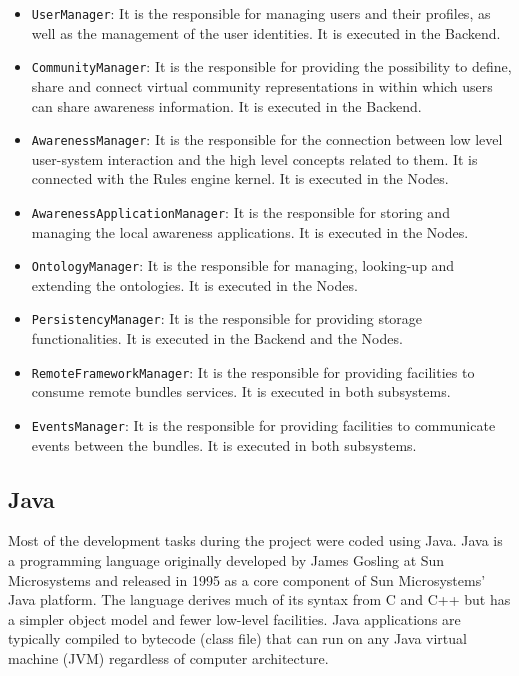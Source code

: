 \begin{itemize}
  \item \verb|UserManager|: It is the responsible for managing users and their
  profiles, as well as the management of the user identities. It is executed in
  the Backend.
  \item \verb|CommunityManager|: It is the responsible for providing the
  possibility to define, share and connect virtual community representations in within which
  users can share awareness information. It is executed in the Backend.
  \item \verb|AwarenessManager|: It is the responsible for the connection
  between low level user-system interaction and the high level concepts related to
  them. It is connected with the Rules engine kernel. It is executed in the
  Nodes.
  \item \verb|AwarenessApplicationManager|: It is the responsible for storing
  and managing the local awareness applications. It is executed
  in the Nodes.
  \item \verb|OntologyManager|: It is the responsible for managing, looking-up
  and extending the ontologies. It is executed in the Nodes.
  \item \verb|PersistencyManager|: It is the responsible for providing storage
  functionalities. It is executed in the Backend and the Nodes.
  \item \verb|RemoteFrameworkManager|: It is the responsible for providing
  facilities to consume remote bundles services. It is executed in both subsystems.
  \item \verb|EventsManager|: It is the responsible for providing facilities to
  communicate events between the bundles. It is executed in both subsystems.
\end{itemize}



\subsection{Java}
Most of the development tasks during the project were coded using Java.
Java is a programming language originally developed by James Gosling at Sun 
Microsystems and released in 1995 as a core component of Sun Microsystems' Java
platform. The language derives much of its syntax from C and C++ but has a
simpler  object model and fewer low-level facilities. Java applications are 
typically compiled to bytecode (class file) that can run on any Java virtual 
machine (JVM) regardless of computer architecture.

